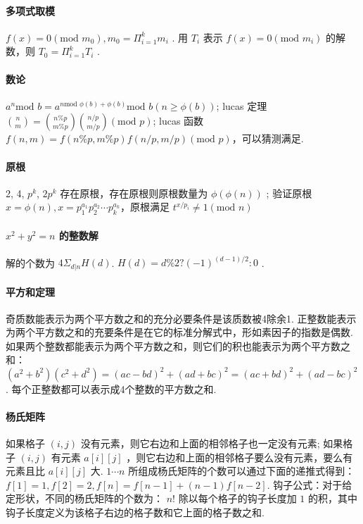 \documentclass[landscape,a4paper]{article}
\begin{document}
\paragraph{多项式取模}
$f(x) = 0 (\text{mod }m_0), m_0 = \Pi_{i=1}^{k}m_i$ . 用 $T_i$ 表示 $f(x) = 0 (\text{mod }m_i)$ 的解数，则 $T_0 = \Pi_{i=1}^{k}T_i$ .

\paragraph{数论}
 $a^n \text{mod }b = a^{n \text{mod }\phi{(b)}+\phi{(b)}} \text{mod }b (n \geq \phi{(b)})$;
 lucas 定理 $\binom{n}{m} = \binom{n\%p}{m\%p}\binom{n/p}{m/p} (\text{mod }p)$;
 lucas 函数 $f(n, m) = f(n\%p,m\%p)f(n/p, m/p) (\text{mod }p)$，可以猜测满足.

\paragraph{原根}
 2, 4, $p^k$, $2p^k$ 存在原根，存在原根则原根数量为 $\phi(\phi(n))$ ;
 验证原根 $x = \phi{(n)}, x = p_1^{a_1}p_2^{a_2}\cdots p_k^{a_k}$，原根满足 $t^{x/p_i} \neq 1 (\text{mod }n)$

\paragraph{$x^2+y^2=n$ 的整数解}
解的个数为 $4\Sigma_{d|n}H(d)$. $H(d)=d\%2 ? (-1)^{(d-1)/2} : 0$ .

\paragraph{平方和定理}
 奇质数能表示为两个平方数之和的充分必要条件是该质数被4除余1.
 正整数能表示为两个平方数之和的充要条件是在它的标准分解式中，形如素因子的指数是偶数.
 如果两个整数都能表示为两个平方数之和，则它们的积也能表示为两个平方数之和： $(a^2+b^2)(c^2+d^2)=(ac-bd)^2+(ad+bc)^2=(ac+bd)^2+(ad-bc)^2$.
 每个正整数都可以表示成4个整数的平方数之和.

\paragraph{杨氏矩阵}
 如果格子 $(i, j)$ 没有元素，则它右边和上面的相邻格子也一定没有元素;
 如果格子 $(i, j)$ 有元素 $a[i][j]$ ，则它右边和上面的相邻格子要么没有元素，要么有元素且比 $a[i][j]$ 大.
 $1 \cdots n$ 所组成杨氏矩阵的个数可以通过下面的递推式得到： $f[1] = 1, f[2] = 2, f[n] = f[n - 1] + (n - 1)f[n - 2]$.
 钩子公式：对于给定形状，不同的杨氏矩阵的个数为： $n!$ 除以每个格子的钩子长度加 $1$ 的积，其中钩子长度定义为该格子右边的格子数和它上面的格子数之和.
\end{document}
